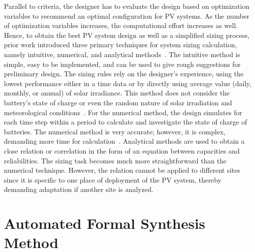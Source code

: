 \documentclass[journal]{IEEEtran}
\begin{document}
Parallel to criteria, the designer has to evaluate the design based on optimization variables to recommend an optimal configuration for PV systems. As the number of optimization variables increases, the computational effort increases as well. Hence, to obtain the best PV system design as well as a simplified sizing process, prior work introduced three primary techniques for system sizing calculation, namely intuitive, numerical, and analytical methods~\cite{Zhou2010}. The intuitive method is simple, easy to be implemented, and can be used to give rough suggestions for preliminary design. The sizing rules rely on the designer's experience, using the lowest performance either in a time data or by directly using average value (daily, monthly, or annual) of solar irradiance. This method does not consider the battery's state of charge or even the random nature of solar irradiation and meteorological conditions~\cite{Alsadi2018}. For the numerical method, the design simulates for each time step within a period to calculate and investigate the state of charge of batteries. The numerical method is very accurate; however, it is complex, demanding more time for calculation~\cite{Park2004}. Analytical methods are used to obtain a close relation or correlation in the form of an equation between capacities and reliabilities. The sizing task becomes much more straightforward than the numerical technique. However, the relation cannot be applied to different sites since it is specific to one place of deployment of the PV system, thereby demanding adaptation if another site is analyzed.

\section{Automated Formal Synthesis Method}
\label{sec:Method}
\end{document}
